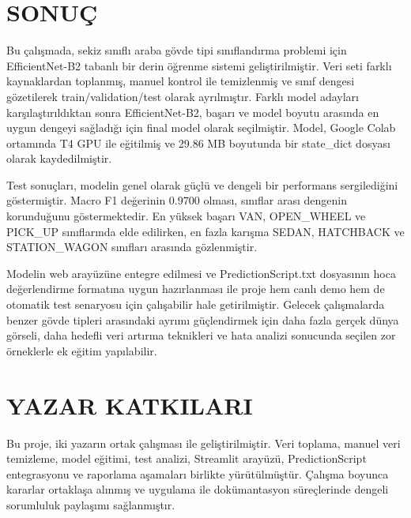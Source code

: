 \documentclass[conference]{IEEEtran}
\begin{document}
\section{SONUÇ}

Bu çalışmada, sekiz sınıflı araba gövde tipi sınıflandırma problemi için
EfficientNet-B2 tabanlı bir derin öğrenme sistemi geliştirilmiştir. Veri
seti farklı kaynaklardan toplanmış, manuel kontrol ile temizlenmiş ve
sınıf dengesi gözetilerek train/validation/test olarak ayrılmıştır. Farklı
model adayları karşılaştırıldıktan sonra EfficientNet-B2, başarı ve model
boyutu arasında en uygun dengeyi sağladığı için final model olarak
seçilmiştir. Model, Google Colab ortamında T4 GPU ile eğitilmiş ve 29.86 MB
boyutunda bir state\_dict dosyası olarak kaydedilmiştir.
\vspace{0.4cm}

Test sonuçları, modelin genel olarak güçlü ve dengeli bir performans
sergilediğini göstermiştir. Macro F1 değerinin 0.9700 olması, sınıflar
arası dengenin korunduğunu göstermektedir. En yüksek başarı VAN,
OPEN\_WHEEL ve PICK\_UP sınıflarında elde edilirken, en fazla karışma
SEDAN, HATCHBACK ve STATION\_WAGON sınıfları arasında gözlenmiştir.
\vspace{0.4cm}

Modelin web arayüzüne entegre edilmesi ve PredictionScript.txt dosyasının
hoca değerlendirme formatına uygun hazırlanması ile proje hem canlı demo
hem de otomatik test senaryosu için çalışabilir hale getirilmiştir. Gelecek
çalışmalarda benzer gövde tipleri arasındaki ayrımı güçlendirmek için daha
fazla gerçek dünya görseli, daha hedefli veri artırma teknikleri ve hata
analizi sonucunda seçilen zor örneklerle ek eğitim yapılabilir.

\section{YAZAR KATKILARI}

Bu proje, iki yazarın ortak çalışması ile geliştirilmiştir. Veri toplama,
manuel veri temizleme, model eğitimi, test analizi, Streamlit arayüzü,
PredictionScript entegrasyonu ve raporlama aşamaları birlikte
yürütülmüştür. Çalışma boyunca kararlar ortaklaşa alınmış ve uygulama ile
dokümantasyon süreçlerinde dengeli sorumluluk paylaşımı sağlanmıştır.
\end{document}
